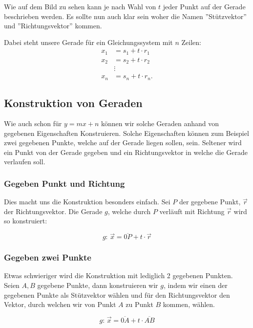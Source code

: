 \documentclass[a4paper,12pt]{article}
\newcommand{\Redbox}[1]{
	{
		\vspace*{0.1cm}
		\begin{tcolorbox}[breakable,colback=yellow!0,colframe=red!65!black,width=\linewidth ]
			{#1}
		\end{tcolorbox}
		
		
	}
}
\newcommand{\Bemerkung}[1]{
	\vspace*{0.3cm}
	\begin{tcolorbox}[breakable,colback=yellow!10,colframe=yellow!65!black,title=\textbf{Bemerkung:},width=\linewidth ]
		{#1}
	\end{tcolorbox}
}
\begin{document}
	Wie auf dem Bild zu sehen kann je nach Wahl von $t$ jeder Punkt auf der Gerade beschrieben werden. 
	Es sollte nun auch klar sein woher die Namen ''Stützvektor'' und ''Richtungsvektor'' kommen.
	\Bemerkung{\label{BemGerGLS}
		Dabei steht unsere Gerade für ein Gleichungssystem mit $n$ Zeilen:
		 \begin{align*}
			 x_1 &= s_1 + t\cdot r_1\\
			 x_2 &= s_2 + t\cdot r_2\\
			     &\vdots\\
			 x_n &= s_n + t\cdot r_n
		.\end{align*}
	}
	\subsection{Konstruktion von Geraden}
	Wie auch schon für $y=mx+n$ können wir solche Geraden anhand von gegebenen Eigenschaften Konstruieren. Solche Eigenschaften können zum Beispiel zwei gegebenen Punkte, welche auf der Gerade liegen sollen, sein. 
	Seltener wird ein Punkt von der Gerade gegeben und ein Richtungsvektor in welche die Gerade verlaufen soll.
	\subsubsection{Gegeben Punkt und Richtung}
	Dies macht uns die Konstruktion besonders einfach.
	Sei $P$ der gegebene Punkt, $\vec{r}$ der Richtungsvektor. Die Gerade $g$, welche durch $P$ verläuft mit Richtung $\vec{r}$ wird so konstruiert:
	\Redbox{\large\[g: \,\vec{x} = \overline{0P} + t\cdot \vec{r}\]}
	\subsubsection{Gegeben zwei Punkte}
	Etwas schwieriger wird die Konstruktion mit lediglich 2 gegebenen Punkten.\\
	Seien $A,B$ gegebene Punkte, dann konstruieren wir $g$, indem wir einen der gegebenen Punkte als Stützvektor wählen und für den Richtungsvektor den Vektor, durch welchen wir von Punkt $A$ zu Punkt $B$ kommen, wählen.
	\Redbox{\large \[g:\, \vec{x}=\overline{0A} +t\cdot \overline{AB} \]}
\end{document}
